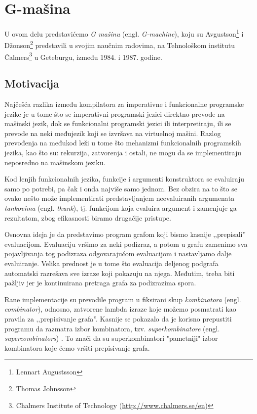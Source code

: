 \section{G-mašina}
\label{sec:Gmasine}

U ovom delu predstavićemo {\em G mašinu} (engl. \textit{G-machine}), koju su Avgustson\footnote{Lennart Augustsson} i Džonson\footnote{Thomas Johnsson} predstavili u svojim naučnim radovima, na Tehnološkom institutu Čalmers\footnote{Chalmers Institute of Technology (\url{http://www.chalmers.se/en})} u Geteburgu, između 1984. i 1987. godine. 

\subsection{Motivacija}

Najčešća razlika između kompilatora za imperativne i funkcionalne programske jezike je u tome što se imperativni programski jezici direktno prevode na mašinski jezik, dok se funkcionalni programski jezici ili interpretiraju, ili se prevode na neki međujezik koji se izvršava na virtuelnoj mašini. Razlog prevođenja na međukod leži u tome što mehanizmi funkcionalnih programskih jezika, kao što su: rekurzija, zatvorenja i ostali, ne mogu da se implementiraju neposredno na mašinskom jeziku.

Kod lenjih funkcionalnih jezika, funkcije i argumenti konstruktora se evaluiraju samo po potrebi, pa čak i onda najviše samo jednom. Bez obzira na to što se ovako nešto može implementirati predstavljanjem neevaluiranih argumenata \textit{tankovima} (engl. \textit{thunk}), tj. funkcijom koja evaluira argument i zamenjuje ga rezultatom, zbog efikasnosti biramo drugačije pristupe.

Osnovna ideja je da predstavimo program grafom koji bismo kasnije ‚‚prepisali''  evaluacijom. Evaluaciju vršimo za neki podizraz, a potom u grafu zamenimo sva pojavljivanja tog podizraza odgovarajućom evaluacijom i nastavljamo dalje evaluiranje. Velika prednost je u tome što evaluacija deljenog podgrafa automatski razrešava sve izraze koji pokazuju na njega. Međutim, treba biti pažljiv jer je kontinuirana pretraga grafa za podizrazima spora.

Rane implementacije su prevodile program u fiksirani skup \textit{kombinatora} (engl. \textit{combinator}), odnosno, zatvorene lambda izraze koje možemo posmatrati kao pravila za ‚‚prepisivanje grafa''. Kasnije se pokazalo da je korisno prepustiti programu da razmatra izbor kombinatora, tzv. {\em superkombinatore} (engl. \textit{supercombinators}) \cite{super-combinators}. To znači da su superkombinatori "pametniji" izbor kombinatora koje ćemo vršiti prepisivanje grafa. %

